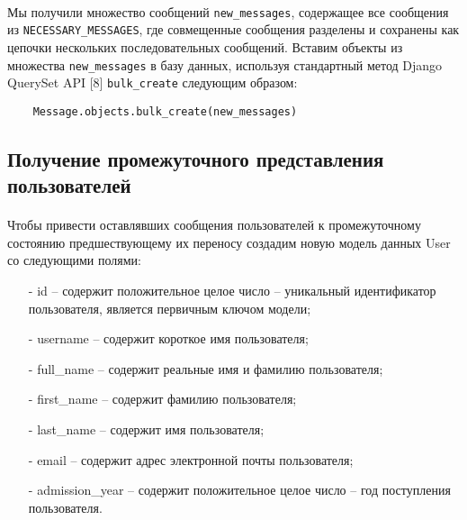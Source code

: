\documentclass[12pt, a4paper, oneside]{article}
\begin{document}
\paragraph{}
Мы получили множество сообщений \texttt{new\_messages}, содержащее все сообщения из \texttt{NECESSARY\_MESSAGES}, где совмещенные сообщения разделены и сохранены как цепочки нескольких последовательных сообщений. Вставим объекты из множества \texttt{new\_messages} в базу данных, используя стандартный метод Django QuerySet API [8] \texttt{bulk\_create} следующим образом:
\begin{verbatim}
    Message.objects.bulk_create(new_messages)
\end{verbatim}
\vspace{1cm}

\subsection{Получение промежуточного представления пользователей}
\paragraph{}
Чтобы привести оставлявших сообщения пользователей к промежуточному состоянию предшествующему их переносу создадим новую модель данных User со следующими полями:
\begin{itemize}
    \item[-] id – содержит положительное целое число – уникальный идентификатор пользователя, является первичным ключом модели;
    \item[-] username – содержит короткое имя пользователя;
    \item[-] full\_name – содержит реальные имя и фамилию пользователя;
    \item[-] first\_name – содержит фамилию пользователя;
    \item[-] last\_name – содержит имя пользователя;
    \item[-] email – содержит адрес электронной почты пользователя;
    \item[-] admission\_year – содержит положительное целое число – год поступления пользователя.
\end{itemize}
\end{document}
